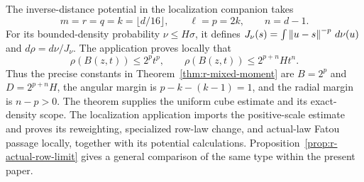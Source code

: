 \begin{remark}
\label{rem:r-localization-substitution}
The inverse-distance potential in the localization companion
\cite[Section~12, Lemma~12.5]{OpenAILocalization2026} takes
\[
 m=r=q=k=\lfloor d/16\rfloor,\qquad \ell=p=2k,\qquad n=d-1.
\]
For its bounded-density probability \(\nu\le H\sigma\), it
defines \(J_\nu(s)=\int\left\lVert u-s\right\rVert^{-p}\,d\nu(u)\) and
\(d\rho=d\nu/J_\nu\).  The application proves locally that
\[
 \rho(B(z,t))\le 2^p t^p,\qquad
 \rho(B(z,t))\le 2^{p+n}H t^n.
\]
Thus the precise constants in Theorem~\ref{thm:r-mixed-moment}
are \(B=2^p\) and \(D=2^{p+n}H\), the angular margin is
\(p-k-(k-1)=1\), and the radial margin is \(n-p>0\).
The theorem supplies the uniform cube estimate and its exact-density
scope.  The localization application imports the positive-scale
estimate and proves its reweighting, specialized row-law change,
and actual-law Fatou passage locally, together with its potential
calculations.
Proposition~\ref{prop:r-actual-row-limit} gives a general comparison
of the same type within the present paper.
\end{remark}
